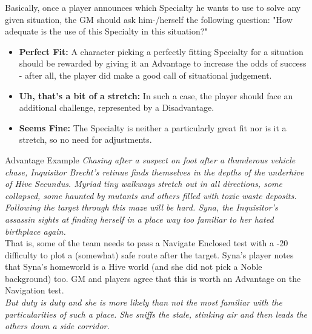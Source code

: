 	Basically, once a player announces which Specialty he wants to use to solve any given situation, the GM should ask him-/herself the following question: "How adequate is the use of this Specialty in this situation?"
	\begin{itemize}
		\item \textbf{Perfect Fit:} A character picking a perfectly fitting Specialty for a situation should be rewarded by giving it an Advantage to increase the odds of success - after all, the player did make a good call of situational judgement.
		\item \textbf{Uh, that's a bit of a stretch:} In such a case, the player should face an additional challenge, represented by a Disadvantage.
		\item \textbf{Seems Fine:} The Specialty is neither a particularly great fit nor is it a stretch, so no need for adjustments.
	\end{itemize}

	\begin{DndSidebar}{Advantage Example}
	\textit{Chasing after a suspect on foot after a thunderous vehicle chase, Inquisitor Brecht's retinue finds themselves in the depths of the underhive of Hive Secundus. Myriad tiny walkways stretch out in all directions, some collapsed, some haunted by mutants and others filled with toxic waste deposits. Following the target through this maze will be hard. Syna, the Inquisitor's assassin sights at finding herself in a place way too familiar to her hated birthplace again.}\\
	\noindent
	That is, some of the team needs to pass a Navigate Enclosed test with a -20 difficulty to plot a (somewhat) safe route after the target. Syna's player notes that Syna's homeworld is a Hive world (and she did not pick a Noble background) too. GM and players agree that this is worth an Advantage on the Navigation test.\\
	\noindent
	\textit{But duty is duty and she is more likely than not the most familiar with the particularities of such a place. She sniffs the stale, stinking air and then leads the others down a side corridor.}
	\end{DndSidebar}


